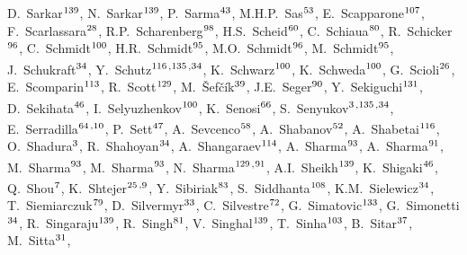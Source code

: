 \begin{flushleft}
D.~Sarkar$^\textrm{\scriptsize 139}$,
N.~Sarkar$^\textrm{\scriptsize 139}$,
P.~Sarma$^\textrm{\scriptsize 43}$,
M.H.P.~Sas$^\textrm{\scriptsize 53}$,
E.~Scapparone$^\textrm{\scriptsize 107}$,
F.~Scarlassara$^\textrm{\scriptsize 28}$,
R.P.~Scharenberg$^\textrm{\scriptsize 98}$,
H.S.~Scheid$^\textrm{\scriptsize 60}$,
C.~Schiaua$^\textrm{\scriptsize 80}$,
R.~Schicker$^\textrm{\scriptsize 96}$,
C.~Schmidt$^\textrm{\scriptsize 100}$,
H.R.~Schmidt$^\textrm{\scriptsize 95}$,
M.O.~Schmidt$^\textrm{\scriptsize 96}$,
M.~Schmidt$^\textrm{\scriptsize 95}$,
J.~Schukraft$^\textrm{\scriptsize 34}$,
Y.~Schutz$^\textrm{\scriptsize 116}$\textsuperscript{,}$^\textrm{\scriptsize 135}$\textsuperscript{,}$^\textrm{\scriptsize 34}$,
K.~Schwarz$^\textrm{\scriptsize 100}$,
K.~Schweda$^\textrm{\scriptsize 100}$,
G.~Scioli$^\textrm{\scriptsize 26}$,
E.~Scomparin$^\textrm{\scriptsize 113}$,
R.~Scott$^\textrm{\scriptsize 129}$,
M.~\v{S}ef\v{c}\'ik$^\textrm{\scriptsize 39}$,
J.E.~Seger$^\textrm{\scriptsize 90}$,
Y.~Sekiguchi$^\textrm{\scriptsize 131}$,
D.~Sekihata$^\textrm{\scriptsize 46}$,
I.~Selyuzhenkov$^\textrm{\scriptsize 100}$,
K.~Senosi$^\textrm{\scriptsize 66}$,
S.~Senyukov$^\textrm{\scriptsize 3}$\textsuperscript{,}$^\textrm{\scriptsize 135}$\textsuperscript{,}$^\textrm{\scriptsize 34}$,
E.~Serradilla$^\textrm{\scriptsize 64}$\textsuperscript{,}$^\textrm{\scriptsize 10}$,
P.~Sett$^\textrm{\scriptsize 47}$,
A.~Sevcenco$^\textrm{\scriptsize 58}$,
A.~Shabanov$^\textrm{\scriptsize 52}$,
A.~Shabetai$^\textrm{\scriptsize 116}$,
O.~Shadura$^\textrm{\scriptsize 3}$,
R.~Shahoyan$^\textrm{\scriptsize 34}$,
A.~Shangaraev$^\textrm{\scriptsize 114}$,
A.~Sharma$^\textrm{\scriptsize 93}$,
A.~Sharma$^\textrm{\scriptsize 91}$,
M.~Sharma$^\textrm{\scriptsize 93}$,
M.~Sharma$^\textrm{\scriptsize 93}$,
N.~Sharma$^\textrm{\scriptsize 129}$\textsuperscript{,}$^\textrm{\scriptsize 91}$,
A.I.~Sheikh$^\textrm{\scriptsize 139}$,
K.~Shigaki$^\textrm{\scriptsize 46}$,
Q.~Shou$^\textrm{\scriptsize 7}$,
K.~Shtejer$^\textrm{\scriptsize 25}$\textsuperscript{,}$^\textrm{\scriptsize 9}$,
Y.~Sibiriak$^\textrm{\scriptsize 83}$,
S.~Siddhanta$^\textrm{\scriptsize 108}$,
K.M.~Sielewicz$^\textrm{\scriptsize 34}$,
T.~Siemiarczuk$^\textrm{\scriptsize 79}$,
D.~Silvermyr$^\textrm{\scriptsize 33}$,
C.~Silvestre$^\textrm{\scriptsize 72}$,
G.~Simatovic$^\textrm{\scriptsize 133}$,
G.~Simonetti$^\textrm{\scriptsize 34}$,
R.~Singaraju$^\textrm{\scriptsize 139}$,
R.~Singh$^\textrm{\scriptsize 81}$,
V.~Singhal$^\textrm{\scriptsize 139}$,
T.~Sinha$^\textrm{\scriptsize 103}$,
B.~Sitar$^\textrm{\scriptsize 37}$,
M.~Sitta$^\textrm{\scriptsize 31}$,

\end{flushleft}
